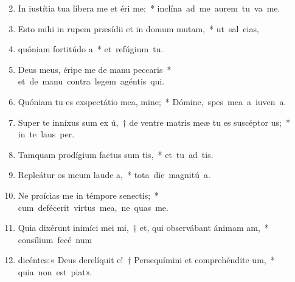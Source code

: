 \begin{flushleft}
\begin{enumerate}[leftmargin=*]
\setcounter{enumi}{1}


\item In iustítia tua líbera me et éri me;~* \mbox{inclína ad me aurem tu  va me.}

\item Esto mihi in rupem præsídii et in domum mutam,~* \mbox{ut sal  cias,}

\item quóniam fortitúdo a~* \mbox{et refúgium   tu.}

\item Deus meus, éripe me de manu peccaris~* \mbox{et de manu contra legem agéntis  qui.}

\item Quóniam tu es exspectátio mea, mine;~* \mbox{Dómine, spes mea a iuven a.}

\item Super te inníxus sum ex ú,~† de ventre matris meæ tu es suscéptor us;~* \mbox{in te laus  per.}

\item Tamquam prodígium factus sum tis,~* \mbox{et tu ad tis.}

\item Repleátur os meum laude a,~* \mbox{tota die magnitú a.}

\item Ne proícias me in témpore senectis;~* \mbox{cum defécerit virtus mea, ne quas me.}

\item Quia dixérunt inimíci mei mi,~† et, qui observábant ánimam am,~* \mbox{consílium fecé  num}

\item dicéntes:« Deus derelíquit e!~† Persequímini et comprehéndite um,~* \mbox{quia non est  piat».}


\end{enumerate}
\end{flushleft}
